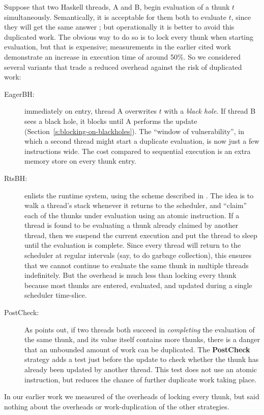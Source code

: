 \documentclass[twocolumn,9pt]{sigplanconf}
\begin{document}
Suppose that two Haskell threads, A and B, begin evaluation of a thunk
$t$ simultaneously.  Semantically, it is acceptable for them both to
evaluate $t$, since they will get the same answer \cite{multiproc05};
but operationally it is better to avoid this duplicated work.  The
obvious way to do so is to lock every thunk when starting evaluation,
but that is expensive; measurements in the earlier cited work
demonstrate an increase in execution time of around 50\%.  So we
considered several variants that trade a reduced overhead against the
risk of duplicated work:
\begin{description}
\item[EagerBH:] immediately on entry, thread A overwrites $t$ with a \emph{black hole}.
If thread B sees a black hole, it blocks until A performs the update
(Section~\ref{s:blocking-on-blackholes}). 
The ``window of vulnerability'', in which a second thread might start
a duplicate evaluation, is now just a few instructions
wide.  The cost compared to sequential execution is an extra
memory store on every thunk entry.

\item[RtsBH:] enlists the runtime system, using
the scheme described in \cite{multiproc05}. The idea is to
walk a thread's stack whenever it returns to the scheduler, and
``claim'' each of the thunks under evaluation using an atomic
instruction.  If a thread is found to be evaluating a thunk already
claimed by another thread, then we suspend the current execution and
put the thread to sleep until the evaluation is complete.  Since every 
thread will return to the scheduler at regular intervals (say, to do
garbage collection), this ensures that we cannot continue to evaluate
the same thunk in multiple threads indefinitely.  But the overhead
is much less than locking every thunk because most thunks are entered,
evaluated, and updated during a single scheduler time-slice.

\item[PostCheck:] 
As \cite{multiproc05} points out, if two threads both succeed in \emph{completing}
the evaluation of the same thunk, and its value itself contains more thunks,
there is a danger that an unbounded amount of work can be duplicated.
The \textbf{PostCheck} strategy adds a test just before the 
update to check whether the thunk has already been updated by another thread.
This test does not use an atomic instruction, but reduces the chance
of further duplicate work taking place.
\end{description}
In our earlier work \cite{multiproc05} we measured of the overheads of
locking every thunk, but said nothing about the overheads or
work-duplication of the other strategies.
\end{document}
